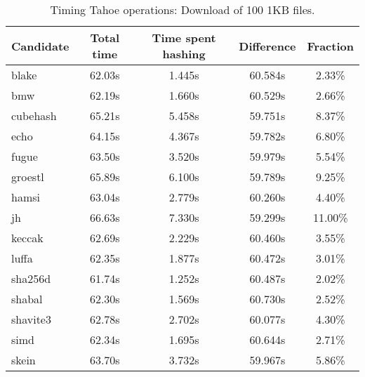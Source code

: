 \begin{table}[h]
  \centering
  \begin{tabular}{ | l | c | c | c | c | }
    \hline
    Candidate & Total time & Time spent hashing & Difference & Fraction \\ \hline
    blake & 62.03s & 1.445s & 60.584s & 2.33\% \\ \hline
    bmw & 62.19s & 1.660s & 60.529s & 2.66\% \\ \hline
    cubehash & 65.21s & 5.458s & 59.751s & 8.37\% \\ \hline
    echo & 64.15s & 4.367s & 59.782s & 6.80\% \\ \hline
    fugue & 63.50s & 3.520s & 59.979s & 5.54\% \\ \hline
    groestl & 65.89s & 6.100s & 59.789s & 9.25\% \\ \hline
    hamsi & 63.04s & 2.779s & 60.260s & 4.40\% \\ \hline
    jh & 66.63s & 7.330s & 59.299s & 11.00\% \\ \hline
    keccak & 62.69s & 2.229s & 60.460s & 3.55\% \\ \hline
    luffa & 62.35s & 1.877s & 60.472s & 3.01\% \\ \hline
    sha256d & 61.74s & 1.252s & 60.487s & 2.02\% \\ \hline
    shabal & 62.30s & 1.569s & 60.730s & 2.52\% \\ \hline
    shavite3 & 62.78s & 2.702s & 60.077s & 4.30\% \\ \hline
    simd & 62.34s & 1.695s & 60.644s & 2.71\% \\ \hline
    skein & 63.70s & 3.732s & 59.967s & 5.86\% \\ \hline
  \end{tabular}
  \caption{Timing Tahoe operations: Download of 100 1KB files.}
  \label{tbl:hashingtimes:get1kb}
\end{table}
